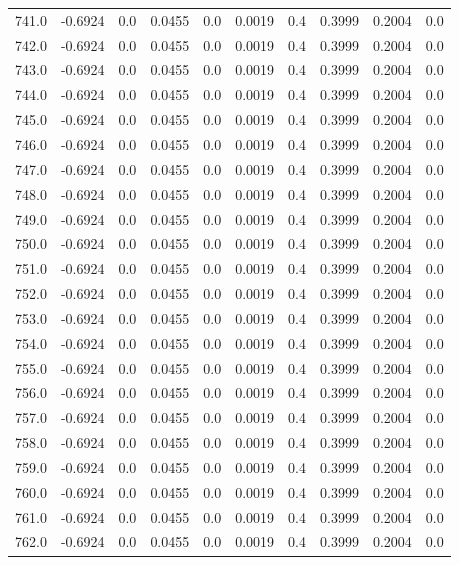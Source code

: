 \begin{longtable}{lrrrrrrrrr}
741.0 & -0.6924 & 0.0 & 0.0455 & 0.0 & 0.0019 & 0.4 & 0.3999 & 0.2004 & 0.0 \\
742.0 & -0.6924 & 0.0 & 0.0455 & 0.0 & 0.0019 & 0.4 & 0.3999 & 0.2004 & 0.0 \\
743.0 & -0.6924 & 0.0 & 0.0455 & 0.0 & 0.0019 & 0.4 & 0.3999 & 0.2004 & 0.0 \\
744.0 & -0.6924 & 0.0 & 0.0455 & 0.0 & 0.0019 & 0.4 & 0.3999 & 0.2004 & 0.0 \\
745.0 & -0.6924 & 0.0 & 0.0455 & 0.0 & 0.0019 & 0.4 & 0.3999 & 0.2004 & 0.0 \\
746.0 & -0.6924 & 0.0 & 0.0455 & 0.0 & 0.0019 & 0.4 & 0.3999 & 0.2004 & 0.0 \\
747.0 & -0.6924 & 0.0 & 0.0455 & 0.0 & 0.0019 & 0.4 & 0.3999 & 0.2004 & 0.0 \\
748.0 & -0.6924 & 0.0 & 0.0455 & 0.0 & 0.0019 & 0.4 & 0.3999 & 0.2004 & 0.0 \\
749.0 & -0.6924 & 0.0 & 0.0455 & 0.0 & 0.0019 & 0.4 & 0.3999 & 0.2004 & 0.0 \\
750.0 & -0.6924 & 0.0 & 0.0455 & 0.0 & 0.0019 & 0.4 & 0.3999 & 0.2004 & 0.0 \\
751.0 & -0.6924 & 0.0 & 0.0455 & 0.0 & 0.0019 & 0.4 & 0.3999 & 0.2004 & 0.0 \\
752.0 & -0.6924 & 0.0 & 0.0455 & 0.0 & 0.0019 & 0.4 & 0.3999 & 0.2004 & 0.0 \\
753.0 & -0.6924 & 0.0 & 0.0455 & 0.0 & 0.0019 & 0.4 & 0.3999 & 0.2004 & 0.0 \\
754.0 & -0.6924 & 0.0 & 0.0455 & 0.0 & 0.0019 & 0.4 & 0.3999 & 0.2004 & 0.0 \\
755.0 & -0.6924 & 0.0 & 0.0455 & 0.0 & 0.0019 & 0.4 & 0.3999 & 0.2004 & 0.0 \\
756.0 & -0.6924 & 0.0 & 0.0455 & 0.0 & 0.0019 & 0.4 & 0.3999 & 0.2004 & 0.0 \\
757.0 & -0.6924 & 0.0 & 0.0455 & 0.0 & 0.0019 & 0.4 & 0.3999 & 0.2004 & 0.0 \\
758.0 & -0.6924 & 0.0 & 0.0455 & 0.0 & 0.0019 & 0.4 & 0.3999 & 0.2004 & 0.0 \\
759.0 & -0.6924 & 0.0 & 0.0455 & 0.0 & 0.0019 & 0.4 & 0.3999 & 0.2004 & 0.0 \\
760.0 & -0.6924 & 0.0 & 0.0455 & 0.0 & 0.0019 & 0.4 & 0.3999 & 0.2004 & 0.0 \\
761.0 & -0.6924 & 0.0 & 0.0455 & 0.0 & 0.0019 & 0.4 & 0.3999 & 0.2004 & 0.0 \\
762.0 & -0.6924 & 0.0 & 0.0455 & 0.0 & 0.0019 & 0.4 & 0.3999 & 0.2004 & 0.0 \\

\end{longtable}
